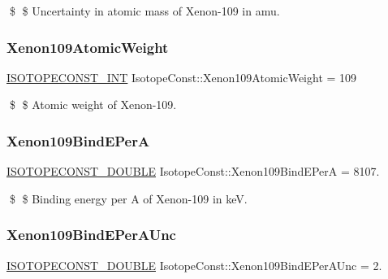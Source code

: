 \$ \$ Uncertainty in atomic mass of Xenon-\/109 in amu. \mbox{\label{group___isotope_const-_xenon-_xe109_gaf75306c2c217faa3bd8338704ed15810}} 
\subsubsection{\texorpdfstring{Xenon109\+Atomic\+Weight}{Xenon109AtomicWeight}}
{\footnotesize\ttfamily \mbox{\hyperlink{group___isotope_const-_macros_ga5f18360b3e99483a35c32d789e62621c}{I\+S\+O\+T\+O\+P\+E\+C\+O\+N\+S\+T\+\_\+\+I\+NT}} Isotope\+Const\+::\+Xenon109\+Atomic\+Weight = 109}

\$ \$ Atomic weight of Xenon-\/109. \mbox{\label{group___isotope_const-_xenon-_xe109_gabf7c9df5ba4f5c9ac5e6953fd1303987}} 
\subsubsection{\texorpdfstring{Xenon109\+Bind\+E\+PerA}{Xenon109BindEPerA}}
{\footnotesize\ttfamily \mbox{\hyperlink{group___isotope_const-_macros_ga8f45a7272ce02c0b4c65c44636ed719a}{I\+S\+O\+T\+O\+P\+E\+C\+O\+N\+S\+T\+\_\+\+D\+O\+U\+B\+LE}} Isotope\+Const\+::\+Xenon109\+Bind\+E\+PerA = 8107.}

\$ \$ Binding energy per A of Xenon-\/109 in keV. \mbox{\label{group___isotope_const-_xenon-_xe109_ga2dc1f877cea64f3ddd29541d49862292}} 
\subsubsection{\texorpdfstring{Xenon109\+Bind\+E\+Per\+A\+Unc}{Xenon109BindEPerAUnc}}
{\footnotesize\ttfamily \mbox{\hyperlink{group___isotope_const-_macros_ga8f45a7272ce02c0b4c65c44636ed719a}{I\+S\+O\+T\+O\+P\+E\+C\+O\+N\+S\+T\+\_\+\+D\+O\+U\+B\+LE}} Isotope\+Const\+::\+Xenon109\+Bind\+E\+Per\+A\+Unc = 2.}

